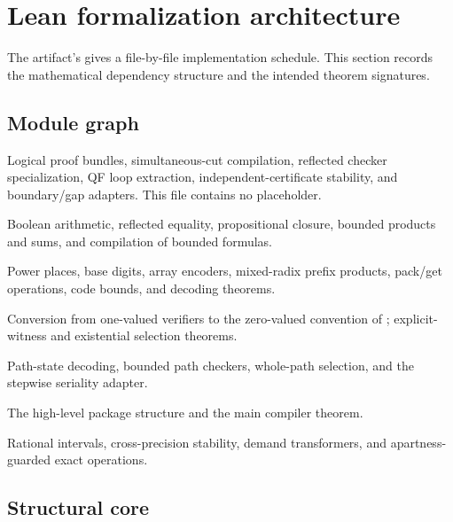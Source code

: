 \section{Lean formalization architecture}

The artifact's  gives a file-by-file
implementation schedule.  This section records the mathematical dependency
structure and the intended theorem signatures.

\subsection{Module graph}

\begin{description}[leftmargin=3.4cm,style=nextline]
\item[\leanname{FQNF/KernelCore}.]
Logical proof bundles, simultaneous-cut compilation, reflected checker
specialization, QF loop extraction, independent-certificate stability, and
boundary/gap adapters.  This file contains no placeholder.

\item[\leanname{FQNF/BoolReflection}.]
Boolean arithmetic, reflected equality, propositional closure, bounded products
and sums, and compilation of bounded formulas.

\item[\leanname{FQNF/Digits}.]
Power places, base digits, array encoders, mixed-radix prefix products, pack/get
operations, code bounds, and decoding theorems.

\item[\leanname{FQNF/CertificateSearch}.]
Conversion from one-valued verifiers to the zero-valued convention of
; explicit-witness and existential selection theorems.

\item[\leanname{FQNF/PathCode}.]
Path-state decoding, bounded path checkers, whole-path selection, and the
stepwise seriality adapter.

\item[\leanname{FQNF/Query}.]
The high-level package structure and the main compiler theorem.

\item[\leanname{FQNF/Names}.]
Rational intervals, cross-precision stability, demand transformers, and
apartness-guarded exact operations.
\end{description}

\subsection{Structural core}

